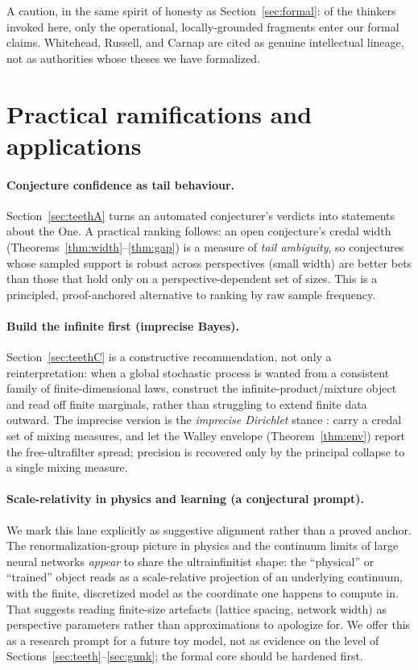 \documentclass[]{article}
\theoremstyle{definition}
\theoremstyle{remark}
\begin{document}
A caution, in the same spirit of honesty as Section~\ref{sec:formal}: of the
thinkers invoked here, only the operational, locally-grounded fragments enter our
formal claims. Whitehead, Russell, and Carnap are cited as genuine intellectual
lineage, not as authorities whose theses we have formalized.

\section{Practical ramifications and applications}
\label{sec:practical}

\paragraph{Conjecture confidence as tail behaviour.} Section~\ref{sec:teethA}
turns an automated conjecturer's verdicts into statements about the One. A practical
ranking follows: an open conjecture's credal width
(Theorems~\ref{thm:width}--\ref{thm:gap}) is a measure of \emph{tail ambiguity}, so
conjectures whose sampled support is robust across perspectives (small width) are
better bets than those that hold only on a perspective-dependent set of sizes. This
is a principled, proof-anchored alternative to ranking by raw sample frequency.

\paragraph{Build the infinite first (imprecise Bayes).} Section~\ref{sec:teethC} is
a constructive recommendation, not only a reinterpretation: when a global
stochastic process is wanted from a consistent family of finite-dimensional laws,
construct the infinite-product/mixture object and read off finite marginals,
rather than struggling to extend finite data outward. The imprecise version is the
\emph{imprecise Dirichlet} stance \cite{Walley1996BagOfMarbles}: carry a credal set
of mixing measures, and let the Walley envelope (Theorem~\ref{thm:env}) report the
free-ultrafilter spread; precision is recovered only by the principal collapse to a
single mixing measure.

\paragraph{Scale-relativity in physics and learning (a conjectural prompt).} We mark
this lane explicitly as suggestive alignment rather than a proved anchor. The
renormalization-group picture in physics and the continuum limits of large neural
networks \emph{appear} to share the ultrainfinitist shape: the ``physical'' or
``trained'' object reads as a scale-relative projection of an underlying continuum,
with the finite, discretized model as the coordinate one happens to compute in. That
suggests reading finite-size artefacts (lattice spacing, network width) as perspective
parameters rather than approximations to apologize for. We offer this as a research
prompt for a future toy model, not as evidence on the level of
Sections~\ref{sec:teeth}--\ref{sec:gunk}; the formal core should be hardened first.
\end{document}
